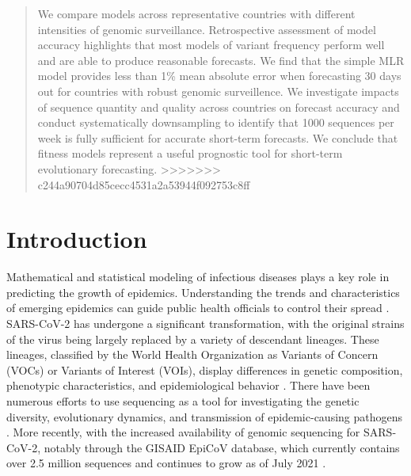 \documentclass[11pt,oneside,letterpaper]{article}
\begin{document}
\begin{abstract}
We compare models across representative countries with different intensities of genomic surveillance.
Retrospective assessment of model accuracy highlights that most models of variant frequency perform well and are able to produce reasonable forecasts.
We find that the simple MLR model provides less than 1\% mean absolute error when forecasting 30 days out for countries with robust genomic surveillence.
We investigate impacts of sequence quantity and quality across countries on forecast accuracy and conduct systematically downsampling to identify that 1000 sequences per week is fully sufficient for accurate short-term forecasts.
We conclude that fitness models represent a useful prognostic tool for short-term evolutionary forecasting.
>>>>>>> c244a90704d85cecc4531a2a53944f092753c8ff

\end{abstract}

\section*{Introduction}

Mathematical and statistical modeling of infectious diseases plays a key role in predicting the growth of epidemics.
Understanding the trends and characteristics of emerging epidemics can guide public health officials to control their spread \cite{ding_value_2021}.
SARS-CoV-2 has undergone a significant transformation, with the original strains of the virus being largely replaced by a variety of descendant lineages.
These lineages, classified by the World Health Organization as Variants of Concern (VOCs) or Variants of Interest (VOIs), display differences in genetic composition, phenotypic characteristics, and epidemiological behavior \cite{konings2021sarscov2}.
There have been numerous efforts to use sequencing as a tool for investigating the genetic diversity, evolutionary dynamics, and transmission of epidemic-causing pathogens \cite{gire_genomic_2014,zhou_pneumonia_2020}.
More recently, with the increased availability of genomic sequencing for SARS-CoV-2, notably through the GISAID EpiCoV database, which currently contains over 2.5 million sequences and continues to grow as of July 2021 \cite{shu2017gisaid}.
\end{document}
